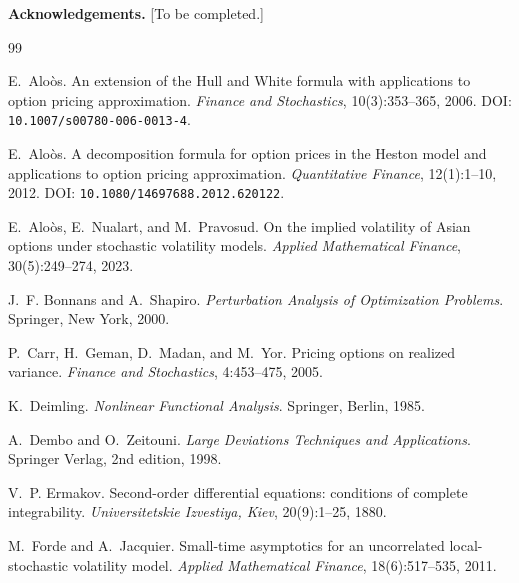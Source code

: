 \documentclass[11pt]{article}
\theoremstyle{definition}
\begin{document}
\bigskip
\noindent\textbf{Acknowledgements.} [To be completed.]


\begin{thebibliography}{99}

E.~Alo\`{o}s.
\newblock An extension of the {H}ull and {W}hite formula with applications to option pricing approximation.
\newblock \emph{Finance and Stochastics}, 10(3):353--365, 2006.
\newblock DOI: \texttt{10.1007/s00780-006-0013-4}.

E.~Alo\`{o}s.
\newblock A decomposition formula for option prices in the {H}eston model and applications to option pricing approximation.
\newblock \emph{Quantitative Finance}, 12(1):1--10, 2012.
\newblock DOI: \texttt{10.1080/14697688.2012.620122}.

E.~Alo\`{o}s, E.~Nualart, and M.~Pravosud.
\newblock On the implied volatility of {A}sian options under stochastic volatility models.
\newblock \emph{Applied Mathematical Finance}, 30(5):249--274, 2023.

J.~F. Bonnans and A.~Shapiro.
\newblock \emph{Perturbation Analysis of Optimization Problems}.
\newblock Springer, New York, 2000.

P.~Carr, H.~Geman, D.~Madan, and M.~Yor.
\newblock Pricing options on realized variance.
\newblock \emph{Finance and Stochastics}, 4:453--475, 2005.

K.~Deimling.
\newblock \emph{Nonlinear Functional Analysis}.
\newblock Springer, Berlin, 1985.

A.~Dembo and O.~Zeitouni.
\newblock \emph{Large Deviations Techniques and Applications}.
\newblock Springer Verlag, 2nd edition, 1998.

V.~P. Ermakov.
\newblock Second-order differential equations: conditions of complete integrability.
\newblock \emph{Universitetskie Izvestiya, Kiev}, 20(9):1--25, 1880.

M.~Forde and A.~Jacquier.
\newblock Small-time asymptotics for an uncorrelated local-stochastic volatility model.
\newblock \emph{Applied Mathematical Finance}, 18(6):517--535, 2011.


\end{thebibliography}
\end{document}
